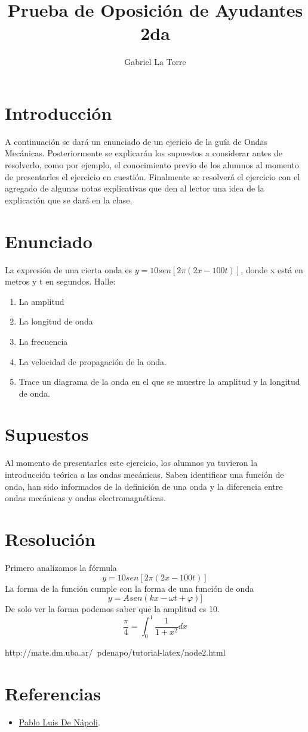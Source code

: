 \documentclass[spanish] {article}
\begin{document}
\title{Prueba de Oposición de Ayudantes 2da}
\author{Gabriel La Torre}

\maketitle
\newpage
\section{Introducción}
A continuación se dará un enunciado de un ejericio de la guía de Ondas Mecánicas. Posteriormente se explicarán los supuestos a considerar antes de resolverlo, como por ejemplo, el conocimiento previo de los alumnos al momento de presentarles el ejercicio en cuestión.
Finalmente se resolverá el ejercicio con el agregado de algunas notas explicativas que den al lector una idea de la explicación que se dará en la clase.
\section{Enunciado}
La expresión de una cierta onda es $y = 10 sen [2 \pi (2x- 100 t)]$, donde x está en metros y t en 
segundos. Halle: 
\begin{enumerate}
\item La amplitud
\item La longitud de onda
\item La frecuencia
\item La velocidad de propagación de la onda. 
\item Trace un diagrama de la onda en el que se muestre la amplitud y la longitud de onda. 
\end{enumerate}

\section{Supuestos}
Al momento de presentarles este ejercicio, los alumnos ya tuvieron la introducción teórica a las ondas mecánicas. Saben identificar una función de onda, han sido informados de la definición de una onda y la diferencia entre ondas mecánicas y ondas electromagnéticas.
\section{Resolución}
Primero analizamos la fórmula
$$y = 10 sen [2 \pi (2x- 100 t)]$$
La forma de la función cumple con la forma de una función de onda
$$y = A sen (kx- \omega t + \varphi)]$$
De solo ver la forma podemos saber que la amplitud es 10.
$$ \frac{\pi}{4} = \int_0^1 \frac{1}{1+x^2} dx $$


http://mate.dm.uba.ar/~pdenapo/tutorial-latex/node2.html
\newpage
\section{Referencias}

\begin{itemize}
  \item \href{http://mate.dm.uba.ar/~pdenapo/tutorial-latex/node2.html}{Pablo Luis De Nápoli}.
\end{itemize}
\end{document}
